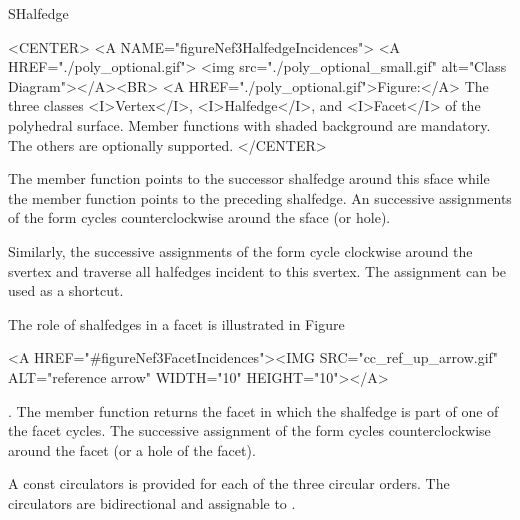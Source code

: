 \begin{ccRefClass}{SHalfedge}
\begin{ccHtmlOnly}
    <CENTER>
    <A NAME="figureNef3HalfedgeIncidences">
    <A HREF="./poly_optional.gif">
        <img src="./poly_optional_small.gif" 
             alt="Class Diagram"></A><BR>
    <A HREF="./poly_optional.gif">Figure:</A>
    The three classes <I>Vertex</I>, <I>Halfedge</I>, and 
          <I>Facet</I> of the polyhedral surface. Member
          functions with shaded background are mandatory. The others
          are optionally supported.
    </CENTER>
\end{ccHtmlOnly}

The  member function points 
to the successor shalfedge around this sface while the  member 
function points to the preceding shalfedge.  An
successive assignments of the form  cycles
counterclockwise around the sface (or hole).

Similarly, the successive
assignments of the form  cycle
clockwise around the svertex and traverse all halfedges incident to
this svertex. The assignment  can be 
used as a shortcut.

The role of shalfedges in a facet is illustrated in 
Figure~\begin{ccHtmlOnly}
  <A HREF="#figureNef3FacetIncidences"><IMG 
  SRC="cc_ref_up_arrow.gif" ALT="reference arrow" WIDTH="10" HEIGHT="10"></A>
\end{ccHtmlOnly}. The  member function returns the facet 
in which
the shalfedge is part of one of the facet cycles. The successive assignment of 
the form  cycles counterclockwise around the facet (or a
hole of the facet).

A const circulators is provided for each of the three circular orders.
The circulators are bidirectional and assignable to .


\ccTypes
{}
\ccThreeToTwo



\ccGlue
{}
\ccGlue
{}
\ccGlue
{}


\end{ccRefClass}
